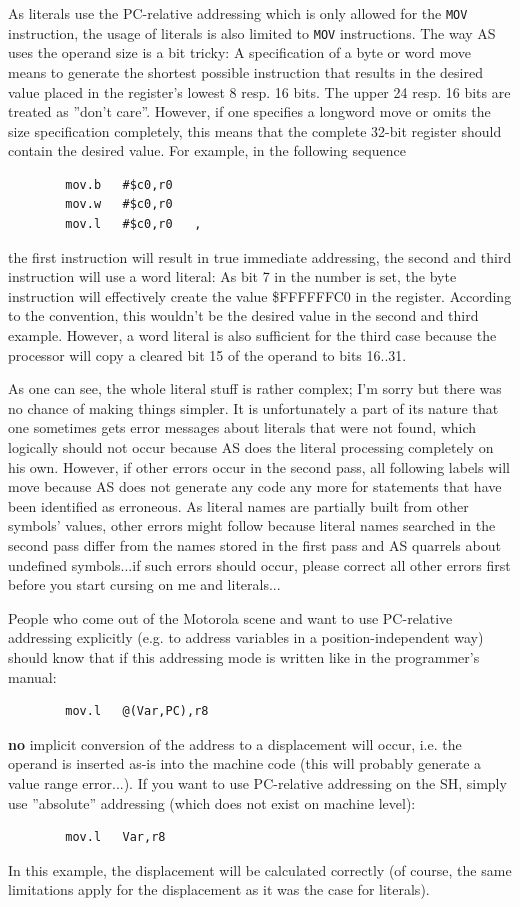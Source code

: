 \documentclass[12pt,twoside]{report}
\newcommand{\bb}[1]{{\bf #1}}
\newcommand{\tty}[1]{{\tt #1}}
\newcommand{\asname}{{AS}}
\begin{document}
As literals use the PC-relative addressing which is only allowed for
the \tty{MOV} instruction, the usage of literals is also limited to
\tty{MOV} instructions.  The way \asname{} uses the operand size is a bit tricky:
A specification of a byte or word move means to generate the shortest
possible instruction that results in the desired value placed in the
register's lowest 8 resp. 16 bits.  The upper 24 resp. 16 bits are treated
as ''don't care''.  However, if one specifies a longword move or omits the
size specification completely, this means that the complete 32-bit
register should contain the desired value.  For example, in the following
sequence
\begin{verbatim}
        mov.b   #$c0,r0
        mov.w   #$c0,r0
        mov.l   #$c0,r0   ,
\end{verbatim}
the first instruction will result in true immediate addressing, the
second and third instruction will use a word literal:  As bit 7 in
the number is set, the byte instruction will effectively create the
value \$FFFFFFC0 in the register.  According to the convention, this
wouldn't be the desired value in the second and third example.
However, a word literal is also sufficient for the third case because
the processor will copy a cleared bit 15 of the operand to bits
16..31.

As one can see, the whole literal stuff is rather complex; I'm sorry but
there was no chance of making things simpler.  It is unfortunately a
part of its nature that one sometimes gets error messages about
literals that were not found, which logically should not occur because
\asname{} does the literal processing completely on his own.  However, if
other errors occur in the second pass, all following labels will move
because \asname{} does not generate any code any more for statements that
have been identified as erroneous.  As literal names are partially built
from other symbols' values, other errors might follow because literal
names searched in the second pass differ from the names stored in the
first pass and \asname{} quarrels about undefined symbols...if such errors
should occur, please correct all other errors first before you start
cursing on me and literals...

People who come out of the Motorola scene and want to use PC-relative
addressing explicitly (e.g. to address variables in a position-independent
way) should know that if this addressing mode is written like in the
programmer's manual:
\begin{verbatim}
        mov.l   @(Var,PC),r8
\end{verbatim}
\bb{no} implicit conversion of the address to a displacement will occur,
i.e. the operand is inserted as-is into the machine code (this will
probably generate a value range error...).  If you want to use
PC-relative addressing on the SH, simply use ''absolute''
addressing (which does not exist on machine level):
\begin{verbatim}
        mov.l   Var,r8
\end{verbatim}
In this example, the displacement will be calculated correctly (of
course, the same limitations apply for the displacement as it was the
case for literals).
\end{document}
